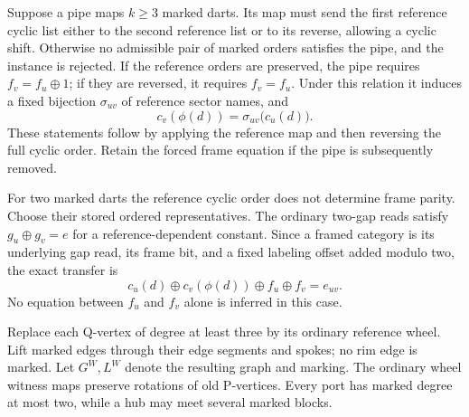 Suppose a pipe maps $k\ge3$ marked darts. Its map must send the first
reference cyclic list either to the second reference list or to its
reverse, allowing a cyclic shift. Otherwise no admissible pair of marked
orders satisfies the pipe, and the instance is rejected. If the reference
orders are preserved, the pipe requires $f_v=f_u\oplus1$; if they are
reversed, it requires $f_v=f_u$. Under this relation it induces a fixed
bijection $\sigma_{uv}$ of reference sector names, and
\begin{equation}
\label{cse:large-transfer}
 c_v(\phi(d))=\sigma_{uv}\bigl(c_u(d)\bigr).
\end{equation}
These statements follow by applying the reference map and then reversing
the full cyclic order. Retain the forced frame equation if the pipe is
subsequently removed.

For two marked darts the reference cyclic order does not determine frame
parity. Choose their stored ordered representatives. The ordinary
two-gap reads satisfy $g_u\oplus g_v=e$ for a reference-dependent
constant. Since a framed category is its underlying gap read, its frame
bit, and a fixed labeling offset added modulo two, the exact transfer is
\begin{equation}
\label{cse:two-transfer}
 c_u(d)\oplus c_v(\phi(d))\oplus f_u\oplus f_v=e_{uv}.
\end{equation}
No equation between $f_u$ and $f_v$ alone is inferred in this case.

Replace each Q-vertex of degree at least three by its ordinary reference
wheel. Lift marked edges through their edge segments and spokes; no rim
edge is marked. Let $G^W,L^W$ denote the resulting graph and marking. The
ordinary wheel witness maps preserve rotations of old P-vertices. Every
port has marked degree at most two, while a hub may meet several marked
blocks.

